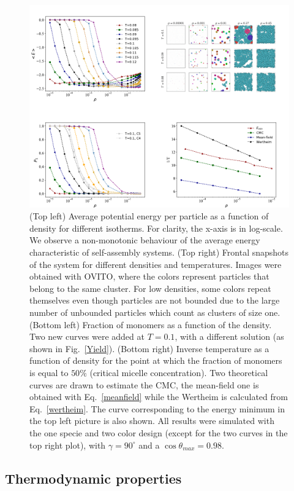 \documentclass[a4paper, amsfonts, amssymb, amsmath, reprint, showkeys, nofootinbib, twoside]{revtex4-1}
\begin{document}
\begin{figure}[t]
	\includegraphics{fig5.pdf}
	\caption{\label{Energy} (Top left) Average potential energy per particle as a function of density for different isotherms. For clarity, the x-axis is in log-scale. We observe a non-monotonic behaviour of the average energy characteristic of self-assembly systems. (Top right) Frontal snapshots of the system for different densities and temperatures. Images were obtained with OVITO, where the colors represent particles that belong to the same cluster. For low densities, some colors repeat themselves even though particles are not bounded due to the large number of unbounded particles which count as clusters of size one. (Bottom left) Fraction of monomers as a function of the density. Two new curves were added at $T=0.1$, with a different solution (as shown in Fig.~\ref{Yield}). (Bottom right) Inverse temperature as a function of density for the point at which the fraction of monomers is equal to $50\%$ (critical micelle concentration). Two theoretical curves are drawn to estimate the CMC, the mean-field one is obtained with Eq.~\eqref{meanfield} while the Wertheim is calculated from Eq.~\eqref{wertheim}. The curve corresponding to the energy minimum in the top left picture is also shown. All results were simulated with the one specie and two color design (except for the two curves in the top right plot), with $\gamma=90^\circ$ and a $\cos\theta_{max}=0.98$.}
\end{figure}

\subsection{Thermodynamic properties}
\end{document}
